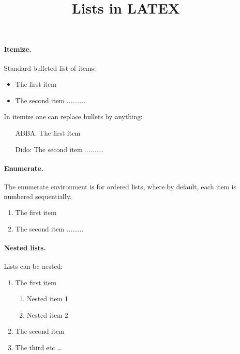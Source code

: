 \documentclass{article}
\begin{document}
              
\title{Lists in LATEX}
\date{}
\maketitle 

\paragraph{Itemize.} 

Standard bulleted list of items:

\begin{itemize}
  \item The first item
  \item The second item ..........
\end{itemize}


In itemize one can replace bullets by anything: %

\begin{itemize}
  \item[ABBA:] The first item
  \item[Dido:] The second item ..........
\end{itemize}

\paragraph{Enumerate.}
The enumerate environment is for ordered lists, where by default, each item is numbered sequentially. 


\begin{enumerate}
  \item The first item
  \item The second item .........
\end{enumerate}



\paragraph{Nested lists.}
Lists can be nested:

\begin{enumerate}
  \item The first item
  \begin{enumerate}
    \item Nested item 1
    \item Nested item 2
  \end{enumerate}
  \item The second item
  \item The third etc \ldots
\end{enumerate}

\
\end{document}

